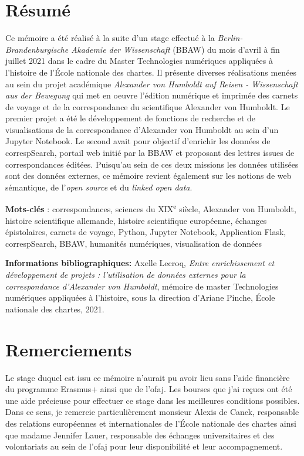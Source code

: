 \documentclass[a4paper, 12pt, twoside]{book}
\begin{document}
\chapter{Résumé}
Ce mémoire a été réalisé à la suite d'un stage effectué à la \textit{Berlin-Brandenburgische Akademie der Wissenschaft} (BBAW) du mois d'avril à fin juillet 2021 dans le cadre du Master Technologies numériques appliquées à l'histoire de l'École nationale des chartes. Il présente diverses réalisations menées au sein du projet académique \textit{Alexander von Humboldt auf Reisen - Wissenschaft aus der Bewegung} qui met en oeuvre l'édition numérique et imprimée des carnets de voyage et de la correspondance du scientifique Alexander von Humboldt. Le premier projet a été le développement de fonctions de recherche et de visualisations de la correspondance d'Alexander von Humboldt au sein d'un Jupyter Notebook. Le second avait pour objectif d'enrichir les données de correspSearch, portail web initié par la BBAW et proposant des lettres issues de correspondances éditées. Puisqu'au sein de ces deux missions les données utilisées sont des données externes, ce mémoire revient également sur les notions de web sémantique, de l'\textit{open source} et du \textit{linked open data}. 

\bigskip
\bigskip
\textbf{Mots-clés} :  correspondances, sciences du XIX\textsuperscript{e} siècle, Alexander von Humboldt, histoire scientifique allemande, histoire scientifique européenne, échanges épistolaires, carnets de voyage, Python, Jupyter Notebook, Application Flask, correspSearch, BBAW, humanités numériques, visualisation de données

\bigskip
\bigskip
\textbf{Informations bibliographiques:} Axelle Lecroq, \textit{Entre enrichissement et développement de projets : l'utilisation de données externes pour la correspondance d'Alexander von Humboldt}, mémoire de master Technologies numériques appliquées à l'histoire, sous la direction d'Ariane Pinche, École nationale des chartes, 2021.

	
\chapter{Remerciements}
\vspace{-27pt}
Le stage duquel est issu ce mémoire n'aurait pu avoir lieu sans l'aide financière du programme Erasmus+ ainsi que de l'\gls{ofaj}. Les bourses que j'ai reçues ont été une aide précieuse pour effectuer ce stage dans les meilleures conditions possibles. Dans ce sens, je remercie particulièrement monsieur Alexis de Canck, responsable des relations européennes et internationales de l'École nationale des chartes ainsi que madame Jennifer Lauer, responsable des échanges universitaires et des volontariats au sein de l'\gls{ofaj} pour leur disponibilité et leur accompagnement. 
\end{document}
